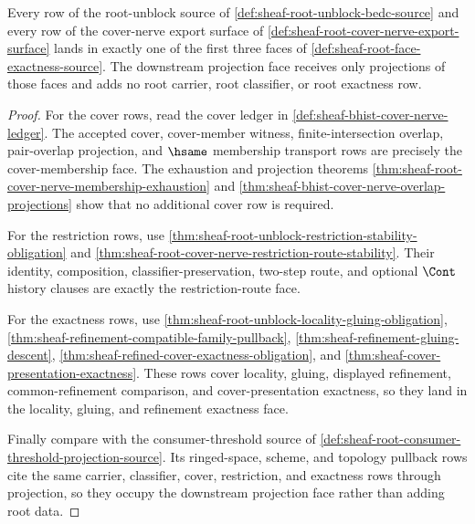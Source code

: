 \begin{theorem}
\label{thm:sheaf-root-face-classifier-coverage}
Every row of the root-unblock source of \autoref{def:sheaf-root-unblock-bedc-source} and every row of the cover-nerve export surface of \autoref{def:sheaf-root-cover-nerve-export-surface} lands in exactly one of the first three faces of \autoref{def:sheaf-root-face-exactness-source}. The downstream projection face receives only projections of those faces and adds no root carrier, root classifier, or root exactness row.
\end{theorem}
\begin{proof}
For the cover rows, read the cover ledger in \autoref{def:sheaf-bhist-cover-nerve-ledger}. The accepted cover, cover-member witness, finite-intersection overlap, pair-overlap projection, and $\hsame$ membership transport rows are precisely the cover-membership face. The exhaustion and projection theorems \autoref{thm:sheaf-root-cover-nerve-membership-exhaustion} and \autoref{thm:sheaf-bhist-cover-nerve-overlap-projections} show that no additional cover row is required.

For the restriction rows, use \autoref{thm:sheaf-root-unblock-restriction-stability-obligation} and \autoref{thm:sheaf-root-cover-nerve-restriction-route-stability}. Their identity, composition, classifier-preservation, two-step route, and optional $\Cont$ history clauses are exactly the restriction-route face.

For the exactness rows, use \autoref{thm:sheaf-root-unblock-locality-gluing-obligation}, \autoref{thm:sheaf-refinement-compatible-family-pullback}, \autoref{thm:sheaf-refinement-gluing-descent}, \autoref{thm:sheaf-refined-cover-exactness-obligation}, and \autoref{thm:sheaf-cover-presentation-exactness}. These rows cover locality, gluing, displayed refinement, common-refinement comparison, and cover-presentation exactness, so they land in the locality, gluing, and refinement exactness face.

Finally compare with the consumer-threshold source of \autoref{def:sheaf-root-consumer-threshold-projection-source}. Its ringed-space, scheme, and topology pullback rows cite the same carrier, classifier, cover, restriction, and exactness rows through projection, so they occupy the downstream projection face rather than adding root data.
\end{proof}

